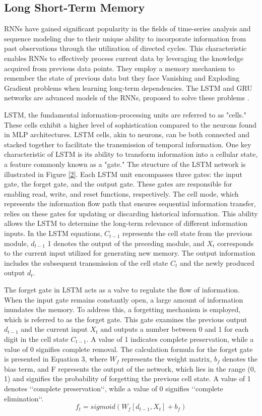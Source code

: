 \documentclass{article}
\begin{document}
\subsection{Long Short-Term Memory}\label{secLSTM}
RNNs have gained significant popularity in the fields of time-series analysis and sequence modeling due to their unique ability to incorporate information from past observations through the utilization of directed cycles. This characteristic enables RNNs to effectively process current data by leveraging the knowledge acquired from previous data points. They employ a memory mechanism to remember the state of previous data but they face Vanishing and Exploding Gradient problems when learning long-term dependencies. The LSTM and GRU networks are advanced models of the RNNs, proposed to solve these problems \cite{srivastava2018comparative,ko2020deep, zhang2021deep}. 

LSTM, the fundamental information-processing units are referred to as "cells." These cells exhibit a higher level of sophistication compared to the neurons found in MLP architectures. LSTM cells, akin to neurons, can be both connected and stacked together to facilitate the transmission of temporal information. One key characteristic of LSTM is its ability to transform information into a cellular state, a feature commonly known as a "gate." The structure of the LSTM network is illustrated in Figure \ref{2}. Each LSTM unit encompasses three gates: the input gate, the forget gate, and the output gate. These gates are responsible for enabling read, write, and reset functions, respectively. The cell mode, which represents the information flow path that ensures sequential information transfer, relies on these gates for updating or discarding historical information. This ability allows the LSTM to determine the long-term relevance of different information inputs. In the LSTM equations, $C_{t-1}$ represents the cell state from the previous module, $d_{t-1}$ 1 denotes the output of the preceding module, and $X_t$ corresponds to the current input utilized for generating new memory. The output information includes the subsequent transmission of the cell state $C_t$ and the newly produced output $d_t$.

The forget gate in LSTM acts as a valve to regulate the flow of information. When the input gate remains constantly open, a large amount of information inundates the memory. To address this, a forgetting mechanism is employed, which is referred to as the forget gate. This gate examines the previous output  $d_{t-1}$ and the current input  $X_t$ and outputs a number between 0 and 1 for each digit in the cell state  $C_{t-1}$. A value of 1 indicates complete preservation, while a value of 0 signifies complete removal. The calculation formula for the forget gate is presented in Equation 3, where $W_f$ represents the weight matrix, $b_f$ denotes the bias term, and F represents the output of the network, which lies in the range (0, 1) and signifies the probability of forgetting the previous cell state. A value of 1 denotes ‘‘complete preservation‘‘, while a value of 0 signifies ‘‘complete elimination‘‘.
\begin{equation}
f_t=sigmoid(W_f[d_{t-1},X_t] + b_f)
\end{equation}
\end{document}
